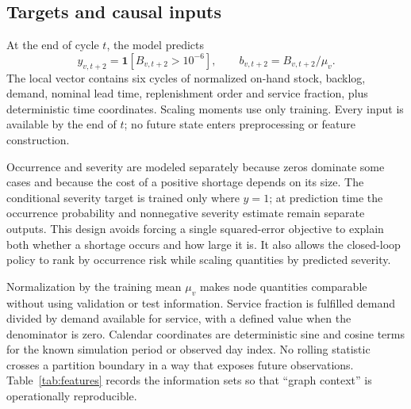 \documentclass[11pt,a4paper]{article}
\newcommand{\ind}{\mathbf 1}
\begin{document}
\subsection{Targets and causal inputs}
At the end of cycle $t$, the model predicts
\begin{equation}y_{v,t+2}=\ind[B_{v,t+2}>10^{-6}],\qquad b_{v,t+2}=B_{v,t+2}/\mu_v.
\end{equation}
The local vector contains six cycles of normalized on-hand stock, backlog, demand, nominal lead time, replenishment order and service fraction, plus deterministic time coordinates. Scaling moments use only training. Every input is available by the end of $t$; no future state enters preprocessing or feature construction.

Occurrence and severity are modeled separately because zeros dominate some cases and because the cost of a positive shortage depends on its size. The conditional severity target is trained only where $y=1$; at prediction time the occurrence probability and nonnegative severity estimate remain separate outputs. This design avoids forcing a single squared-error objective to explain both whether a shortage occurs and how large it is. It also allows the closed-loop policy to rank by occurrence risk while scaling quantities by predicted severity.

Normalization by the training mean $\mu_v$ makes node quantities comparable without using validation or test information. Service fraction is fulfilled demand divided by demand available for service, with a defined value when the denominator is zero. Calendar coordinates are deterministic sine and cosine terms for the known simulation period or observed day index. No rolling statistic crosses a partition boundary in a way that exposes future observations. Table~\ref{tab:features} records the information sets so that ``graph context'' is operationally reproducible.
\end{document}
